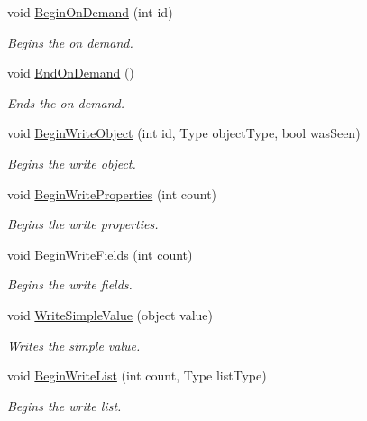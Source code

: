 \begin{DoxyCompactItemize}
void \hyperlink{class_serialization_1_1_binary_serializer_a6b09a7f66a88dc5488ed1fc5996f5452}{Begin\+On\+Demand} (int id)
\begin{DoxyCompactList}\small\item\em Begins the on demand. \end{DoxyCompactList}\item 
void \hyperlink{class_serialization_1_1_binary_serializer_a6a8d02da39538d740b84832d03a58766}{End\+On\+Demand} ()
\begin{DoxyCompactList}\small\item\em Ends the on demand. \end{DoxyCompactList}\item 
void \hyperlink{class_serialization_1_1_binary_serializer_ad2a4bb14be8f85f4de4539f8aaddac49}{Begin\+Write\+Object} (int id, Type object\+Type, bool was\+Seen)
\begin{DoxyCompactList}\small\item\em Begins the write object. \end{DoxyCompactList}\item 
void \hyperlink{class_serialization_1_1_binary_serializer_a021a50d6702e32e15c197783a0bad05a}{Begin\+Write\+Properties} (int count)
\begin{DoxyCompactList}\small\item\em Begins the write properties. \end{DoxyCompactList}\item 
void \hyperlink{class_serialization_1_1_binary_serializer_a40709bdcdae381b2138a48e005e96ab2}{Begin\+Write\+Fields} (int count)
\begin{DoxyCompactList}\small\item\em Begins the write fields. \end{DoxyCompactList}\item 
void \hyperlink{class_serialization_1_1_binary_serializer_a91a35ade763c6b2def327e82a5ea7dad}{Write\+Simple\+Value} (object value)
\begin{DoxyCompactList}\small\item\em Writes the simple value. \end{DoxyCompactList}\item 
void \hyperlink{class_serialization_1_1_binary_serializer_a70c5b0751ea84a7db8cb2b4a89576db3}{Begin\+Write\+List} (int count, Type list\+Type)
\begin{DoxyCompactList}\small\item\em Begins the write list. \end{DoxyCompactList}\item 

\end{DoxyCompactItemize}
